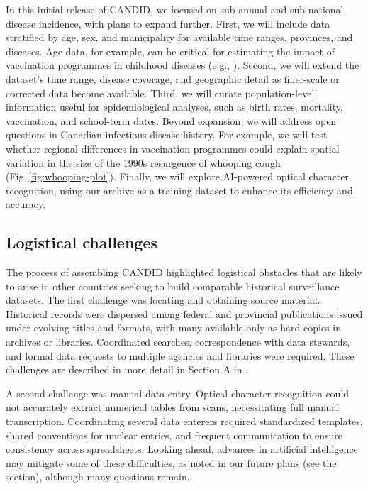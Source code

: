 \documentclass[10pt,letterpaper]{article}
\begin{document}
In this initial release of CANDID, we focused on sub-annual and sub-national disease incidence, with plans to expand further. First, we will include data stratified by age, sex, and municipality for available time ranges, provinces, and diseases. Age data, for example, can be critical for estimating the impact of vaccination programmes in childhood diseases (e.g., \cite{wilkinson2022impact}). Second, we will extend the dataset's time range, disease coverage, and geographic detail as finer-scale or corrected data become available. Third, we will curate population-level information useful for epidemiological analyses, such as birth rates, mortality, vaccination, and school-term dates. Beyond expansion, we will address open questions in Canadian infectious disease history. For example, we will test whether regional differences in vaccination programmes could explain spatial variation in the size of the 1990s resurgence of whooping cough (Fig~\ref{fig:whooping-plot}). Finally, we will explore AI-powered optical character recognition, using our archive as a training dataset to enhance its efficiency and accuracy.

\subsection*{Logistical challenges}\label{sec:logistics}

The process of assembling CANDID highlighted logistical obstacles that are likely to arise in other countries seeking to build comparable historical surveillance datasets. The first challenge was locating and obtaining source material. Historical records were dispersed among federal and provincial publications issued under evolving titles and formats, with many available only as hard copies in archives or libraries. Coordinated searches, correspondence with data stewards, and formal data requests to multiple agencies and libraries were required. These challenges are described in more detail in Section A in .

A second challenge was manual data entry. Optical character recognition could not accurately extract numerical tables from scans, necessitating full manual transcription. Coordinating several data enterers required standardized templates, shared conventions for unclear entries, and frequent communication to ensure consistency across spreadsheets. Looking ahead, advances in artificial intelligence may mitigate some of these difficulties, as noted in our future plans (see the  section), although many questions remain.
\end{document}
